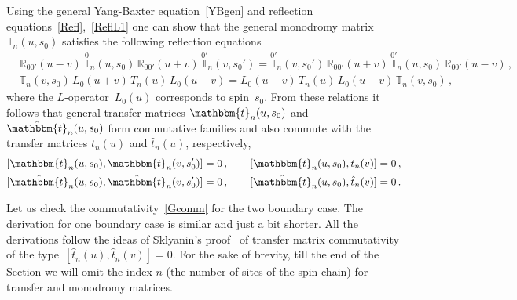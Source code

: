 \documentclass[a4paper,11pt]{article}
\numberwithin{equation}{section}
\begin{document}
Using the general Yang-Baxter equation~\eqref{YBgen} and reflection equations~\eqref{Refl},~\eqref{ReflL1} one can show that the general monodromy matrix $\mathbb{T}_n(u,s_0)$ satisfies the following reflection equations
\begin{align}
	\label{RTRTgen}
	&\mathbb{R}_{00'}(u-v)\,\overset{0}{\mathbb{T}}_n(u,s_0)\,\mathbb{R}_{00'}(u+v)\,\overset{0'}{\mathbb{T}}_n(v,s_0') = \overset{0'}{\mathbb{T}}_n(v,s_0')\,\mathbb{R}_{00'}(u+v)\,\overset{0'}{\mathbb{T}}_n(u,s_0)\,\mathbb{R}_{00'}(u-v) \,,\\
	\label{TLTL}
	&\mathbb{T}_n(v,s_0)\,L_0(u+v)\,T_n(u)\,L_0(u-v) = L_0(u-v)\,T_n(u)\,L_0(u+v)\,\mathbb{T}_n(v,s_0) \,,
\end{align}	
where the $L$-operator~$L_0(u)$ corresponds to spin~$s_0$.
From these relations it follows that general transfer matrices $\mathbbm{t}_n(u,s_0)$ and $\hat{\mathbbm{t}}_n(u,s_0)$ form commutative families and also commute with the transfer matrices $t_n(u)$ and $\hat{t}_n(u)$, respectively,
\begin{align}
	& \nonumber
	[\mathbbm{t}_n(u,s_0), \mathbbm{t}_n(v,s_0')] = 0 \,, \quad \quad [\mathbbm{t}_n(u,s_0), t_n(v)] = 0 \,, \\
	& \label{Gcomm}
	[\hat{\mathbbm{t}}_n(u,s_0), \hat{\mathbbm{t}}_n(v,s_0')] = 0 \,, \quad \quad [\hat{\mathbbm{t}}_n(u,s_0), \hat{t}_n(v)] = 0 \,.
\end{align}
	
Let us check the commutativity~\eqref{Gcomm} for the two boundary case. The derivation for one boundary case is similar and just a bit shorter.
All the derivations follow the ideas of Sklyanin's proof~\cite[Section~3]{Skl:Boundary} of transfer matrix commutativity of the type~$[\hat{t}_n(u),\hat{t}_n(v)]=0$.
For the sake of brevity, till the end of the Section we will omit the index $n$ (the number of sites of the spin chain) for transfer and monodromy matrices.
\end{document}
